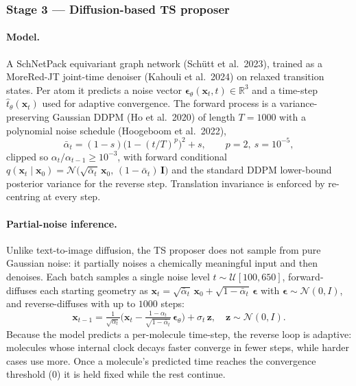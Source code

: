 \subsubsection{Stage 3 --- Diffusion-based TS proposer}
\label{sec:diffusion}

\paragraph{Model.}
A SchNetPack equivariant graph network (Sch{\"u}tt et al.\ 2023), trained as a MoreRed-JT joint-time denoiser (Kahouli et al.\ 2024) on relaxed transition states. Per atom it predicts a noise vector $\boldsymbol{\epsilon}_\theta(\mathbf{x}_t, t) \in \mathbb{R}^3$ and a time-step $\hat{t}_\theta(\mathbf{x}_t)$ used for adaptive convergence. The forward process is a variance-preserving Gaussian DDPM (Ho et al.\ 2020) of length $T = 1000$ with a polynomial noise schedule (Hoogeboom et al.\ 2022),
\begin{equation}
    \bar{\alpha}_t = (1 - s)\bigl(1 - (t/T)^p\bigr)^2 + s, \qquad p = 2,\ s = 10^{-5},
\end{equation}
clipped so $\alpha_t / \alpha_{t-1} \geq 10^{-3}$, with forward conditional $q(\mathbf{x}_t \mid \mathbf{x}_0) = \mathcal{N}\bigl(\sqrt{\bar{\alpha}_t}\,\mathbf{x}_0,\,(1 - \bar{\alpha}_t)\,\mathbf{I}\bigr)$ and the standard DDPM lower-bound posterior variance for the reverse step. Translation invariance is enforced by re-centring at every step.

\paragraph{Partial-noise inference.}
Unlike text-to-image diffusion, the TS proposer does not sample from pure Gaussian noise: it partially noises a chemically meaningful input and then denoises. Each batch samples a single noise level $t \sim \mathcal{U}[100, 650]$, forward-diffuses each starting geometry as $\mathbf{x}_t = \sqrt{\bar{\alpha}_t}\,\mathbf{x}_0 + \sqrt{1 - \bar{\alpha}_t}\,\boldsymbol{\epsilon}$ with $\boldsymbol{\epsilon} \sim \mathcal{N}(0, I)$, and reverse-diffuses with up to $1000$ steps:
\begin{equation}
    \mathbf{x}_{t-1} = \tfrac{1}{\sqrt{\alpha_t}}\bigl(\mathbf{x}_t - \tfrac{1-\alpha_t}{\sqrt{1 - \bar{\alpha}_t}}\,\boldsymbol{\epsilon}_\theta\bigr) + \sigma_t\,\mathbf{z}, \quad \mathbf{z} \sim \mathcal{N}(0,I).
\end{equation}
Because the model predicts a per-molecule time-step, the reverse loop is adaptive: molecules whose internal clock decays faster converge in fewer steps, while harder cases use more. Once a molecule's predicted time reaches the convergence threshold ($0$) it is held fixed while the rest continue.

